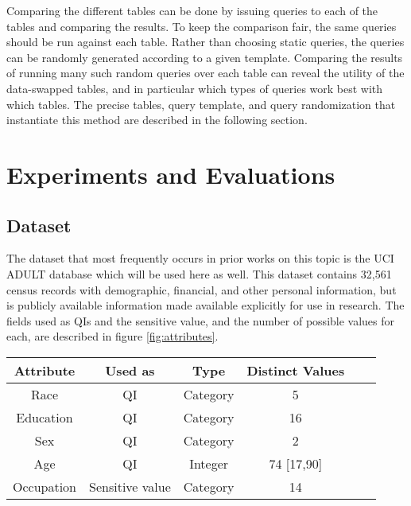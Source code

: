 Comparing the different tables can be done by issuing queries to each of the tables and comparing the results. To keep the comparison fair, the same queries should be run against each table. Rather than choosing static queries, the queries can be randomly generated according to a given template. Comparing the results of running many such random queries over each table can reveal the utility of the data-swapped tables, and in particular which types of queries work best with which tables. The precise tables, query template, and query randomization that instantiate this method are described in the following section.

\section{Experiments and Evaluations}

\subsection{Dataset}
\label{section:dataset}
The dataset that most frequently occurs in prior works on this topic is the UCI ADULT database\cite{adultDatabase} which will be used here as well. This dataset contains 32,561 census records with demographic, financial, and other personal information, but is publicly available information made available explicitly for use in research. The fields used as QIs and the sensitive value, and the number of possible values for each, are described in figure \ref{fig:attributes}.

\begin{figure*}
\centering
\begin{tabular}{|c||c|c|c|c|c|}
\hline
Attribute & Used as & Type & Distinct Values  \\
\hline
\hline
Race & QI & Category & 5 \\
\hline
Education & QI & Category & 16  \\
\hline
Sex & QI & Category & 2  \\
\hline
Age & QI & Integer & 74 [17,90]  \\
\hline
Occupation & Sensitive value & Category & 14  \\
\hline
\end{tabular}
\caption{Attributes in the ADULT database.}
\label{fig:attributes}
\end{figure*}

